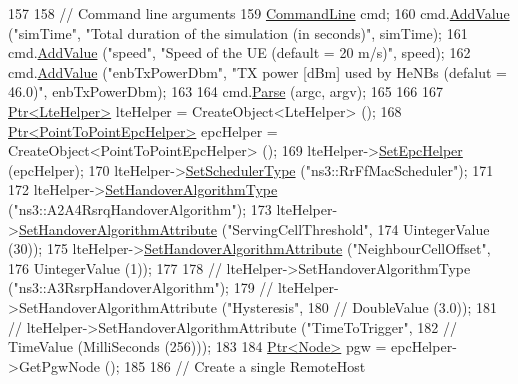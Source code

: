 \begin{DoxyCode}
157 
158   \textcolor{comment}{// Command line arguments}
159   \hyperlink{classns3_1_1CommandLine}{CommandLine} cmd;
160   cmd.\hyperlink{classns3_1_1CommandLine_addcfb546c7ad4c8bd0965654d55beb8e}{AddValue} (\textcolor{stringliteral}{"simTime"}, \textcolor{stringliteral}{"Total duration of the simulation (in seconds)"}, simTime);
161   cmd.\hyperlink{classns3_1_1CommandLine_addcfb546c7ad4c8bd0965654d55beb8e}{AddValue} (\textcolor{stringliteral}{"speed"}, \textcolor{stringliteral}{"Speed of the UE (default = 20 m/s)"}, speed);
162   cmd.\hyperlink{classns3_1_1CommandLine_addcfb546c7ad4c8bd0965654d55beb8e}{AddValue} (\textcolor{stringliteral}{"enbTxPowerDbm"}, \textcolor{stringliteral}{"TX power [dBm] used by HeNBs (defalut = 46.0)"}, enbTxPowerDbm);
163 
164   cmd.\hyperlink{classns3_1_1CommandLine_a5c10b85b3207e5ecb48d907966923156}{Parse} (argc, argv);
165 
166 
167   \hyperlink{classns3_1_1Ptr}{Ptr<LteHelper>} lteHelper = CreateObject<LteHelper> ();
168   \hyperlink{classns3_1_1Ptr}{Ptr<PointToPointEpcHelper>} epcHelper = CreateObject<PointToPointEpcHelper> ();
169   lteHelper->\hyperlink{classns3_1_1LteHelper_a324079a1ccd54ce949786b83d6b95915}{SetEpcHelper} (epcHelper);
170   lteHelper->\hyperlink{classns3_1_1LteHelper_a8f86e55b8b80a81732c4b2df00fb25d5}{SetSchedulerType} (\textcolor{stringliteral}{"ns3::RrFfMacScheduler"});
171 
172   lteHelper->\hyperlink{classns3_1_1LteHelper_a6301630b8a7082043efff2a7aaaa1d20}{SetHandoverAlgorithmType} (\textcolor{stringliteral}{"ns3::A2A4RsrqHandoverAlgorithm"});
173   lteHelper->\hyperlink{classns3_1_1LteHelper_a4da448bb1d3d13534cc54f6b7d33f26a}{SetHandoverAlgorithmAttribute} (\textcolor{stringliteral}{"ServingCellThreshold"},
174                                             UintegerValue (30));
175   lteHelper->\hyperlink{classns3_1_1LteHelper_a4da448bb1d3d13534cc54f6b7d33f26a}{SetHandoverAlgorithmAttribute} (\textcolor{stringliteral}{"NeighbourCellOffset"},
176                                             UintegerValue (1));
177 
178   \textcolor{comment}{//  lteHelper->SetHandoverAlgorithmType ("ns3::A3RsrpHandoverAlgorithm");}
179   \textcolor{comment}{//  lteHelper->SetHandoverAlgorithmAttribute ("Hysteresis",}
180   \textcolor{comment}{//                                            DoubleValue (3.0));}
181   \textcolor{comment}{//  lteHelper->SetHandoverAlgorithmAttribute ("TimeToTrigger",}
182   \textcolor{comment}{//                                            TimeValue (MilliSeconds (256)));}
183 
184   \hyperlink{classns3_1_1Ptr}{Ptr<Node>} pgw = epcHelper->GetPgwNode ();
185 
186   \textcolor{comment}{// Create a single RemoteHost}

\end{DoxyCode}
